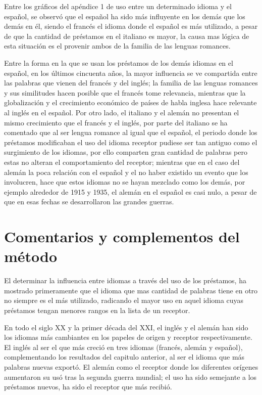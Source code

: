 Entre los gráficos del apéndice 1 de uso entre un determinado idioma y el español, se observó que el español ha sido más influyente en los demás que los demás en él,  siendo el francés el idioma donde el español es más utilizado, a pesar de que la cantidad de préstamos en el italiano es mayor, la causa mas lógica  de esta situación es el provenir ambos de la familia de las lenguas romances. 

Entre la forma en la que se usan los préstamos de los demás idiomas en el español,  en los últimos cincuenta años, la mayor influencia se ve compartida entre las palabras que vienen del francés y  del inglés;  la familia de las lenguas romances y sus similitudes hacen posible que el francés tome relevancia, mientras que la globalización y el crecimiento económico de países de habla inglesa hace relevante al inglés en el español.   Por otro lado,  el italiano y el alemán  no presentan el mismo crecimiento que el francés y el inglés,  por parte del italiano se ha comentado que al ser lengua romance al igual que el español,  el periodo donde los préstamos modificaban el uso del idioma receptor pudiese ser tan antiguo como el surgimiento de los idiomas,  por ello comparten gran cantidad de palabras pero estas no alteran el comportamiento del receptor; mientras que en el caso del alemán la poca relación con el español y el no haber existido un evento que los involucren,  hace que estos idiomas no se hayan mezclado como los demás,  por ejemplo alrededor de 1915 y 1935,  el alemán en el español es casi nulo, a pesar de que en esas fechas se desarrollaron las grandes guerras.


\newpage
\section{Comentarios y complementos del método}


El determinar la influencia entre idiomas a través del uso de los préstamos, ha mostrado primeramente que el idioma que mas cantidad de palabras tiene en otro no siempre es el más utilizado,  radicando el mayor uso en aquel idioma cuyas préstamos tengan menores rangos en la lista de un receptor. 

En todo el siglo XX y la primer década del XXI, el inglés y el alemán han sido los idiomas más cambiantes en los papeles de origen y receptor respectivamente.
El inglés al ser el que más creció en tres idiomas (francés, alemán y español), complementando los resultados del capitulo anterior, al ser el idioma que más palabras nuevas exportó.  El alemán como el receptor donde los diferentes orígenes aumentaron su usó tras la segunda guerra mundial; el uso ha sido semejante a los préstamos nuevos, ha sido el receptor que más recibió. 

